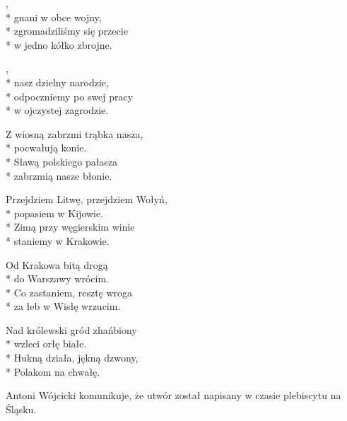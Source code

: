 \begin{lyrics}[longestline={Przejdziem Litwę, przejdziem Wołyń,}]

,\\*
gnani w obce wojny,\\*
zgromadziliśmy się przecie\\*
w jedno kółko zbrojne.

\begin{chorus}
,\\*
nasz dzielny narodzie,\\*
odpoczniemy po swej pracy\\*
w ojczystej zagrodzie.
\end{chorus}

Z wiosną zabrzmi trąbka nasza,\\*
pocwałują konie.\\*
Sławą polskiego pałasza\\*
zabrzmią nasze błonie.

\chorusref

Przejdziem Litwę, przejdziem Wołyń,\\*
popasiem w Kijowie.\\*
Zimą przy węgierskim winie\\*
staniemy w Krakowie.

\chorusref

Od Krakowa bitą drogą\\*
do Warszawy wrócim.\\*
Co zastaniem, resztę wroga\\*
za łeb w Wisłę wrzucim.

\chorusref

Nad królewski gród zhańbiony\\*
wzleci orłę białe.\\*
Hukną działa, jękną dzwony,\\*
Polakom na chwałę.

\chorusref
\end{lyrics}



\begin{info}Antoni Wójcicki komunikuje, że utwór został napisany w czasie plebiscytu na Śląsku.\end{info}

